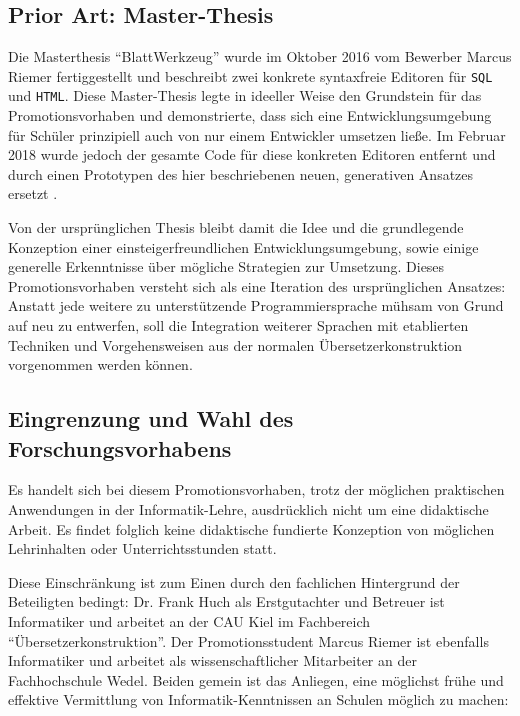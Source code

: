 \documentclass[paper=a4,fontsize=12pt,parskip=half]{scrartcl}
\begin{document}
\subsection{Prior Art: Master-Thesis}

Die Masterthesis \enquote{BlattWerkzeug} \cite{riemer_blattwerkzeug_2016}  wurde im Oktober 2016 vom Bewerber Marcus Riemer fertiggestellt und beschreibt zwei konkrete syntaxfreie Editoren für \texttt{SQL} und \texttt{HTML}. Diese Master-Thesis legte in ideeller Weise den Grundstein für das Promotionsvorhaben und demonstrierte, dass sich eine Entwicklungsumgebung für Schüler prinzipiell auch von nur einem Entwickler umsetzen ließe. Im Februar 2018 wurde jedoch der gesamte Code für diese konkreten Editoren entfernt und durch einen Prototypen des hier beschriebenen neuen, generativen Ansatzes ersetzt \cite{riemer_commit_2018}.

Von der ursprünglichen Thesis bleibt damit die Idee und die grundlegende Konzeption einer einsteigerfreundlichen Entwicklungsumgebung, sowie einige generelle Erkenntnisse über mögliche Strategien zur Umsetzung. Dieses Promotionsvorhaben versteht sich als eine Iteration des ursprünglichen Ansatzes: Anstatt jede weitere zu unterstützende Programmiersprache mühsam von Grund auf neu zu entwerfen, soll die Integration weiterer Sprachen mit etablierten Techniken und Vorgehensweisen aus der normalen Übersetzerkonstruktion vorgenommen werden können.

\subsection{Eingrenzung und Wahl des Forschungsvorhabens}

Es handelt sich bei diesem Promotionsvorhaben, trotz der möglichen praktischen Anwendungen in der Informatik-Lehre, ausdrücklich nicht um eine didaktische Arbeit. Es findet folglich keine didaktische fundierte Konzeption von möglichen Lehrinhalten oder Unterrichtsstunden statt.

Diese Einschränkung ist zum Einen durch den fachlichen Hintergrund der Beteiligten bedingt: Dr. Frank Huch als Erstgutachter und Betreuer ist Informatiker und arbeitet an der CAU Kiel im Fachbereich \enquote{Übersetzerkonstruktion}. Der Promotionsstudent Marcus Riemer ist ebenfalls Informatiker und arbeitet als wissenschaftlicher Mitarbeiter an der Fachhochschule Wedel. Beiden gemein ist das Anliegen, eine möglichst frühe und effektive Vermittlung von Informatik-Kenntnissen an Schulen möglich zu machen:
\end{document}
